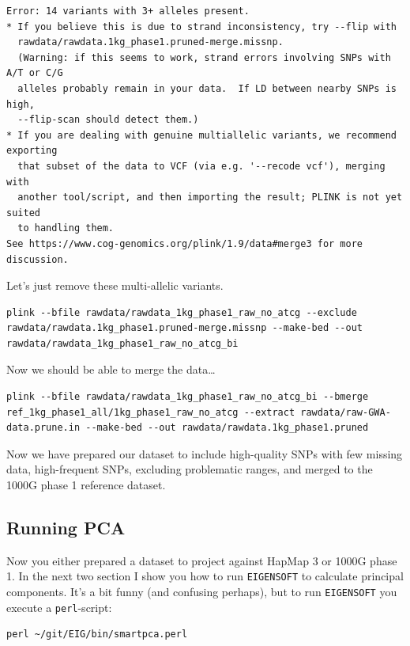 \documentclass[
]{book}
\newcommand{\passthrough}[1]{#1}
\begin{document}
\begin{lstlisting}
Error: 14 variants with 3+ alleles present.
* If you believe this is due to strand inconsistency, try --flip with
  rawdata/rawdata.1kg_phase1.pruned-merge.missnp.
  (Warning: if this seems to work, strand errors involving SNPs with A/T or C/G
  alleles probably remain in your data.  If LD between nearby SNPs is high,
  --flip-scan should detect them.)
* If you are dealing with genuine multiallelic variants, we recommend exporting
  that subset of the data to VCF (via e.g. '--recode vcf'), merging with
  another tool/script, and then importing the result; PLINK is not yet suited
  to handling them.
See https://www.cog-genomics.org/plink/1.9/data#merge3 for more discussion.
\end{lstlisting}

Let's just remove these multi-allelic variants.

\begin{lstlisting}
plink --bfile rawdata/rawdata_1kg_phase1_raw_no_atcg --exclude rawdata/rawdata.1kg_phase1.pruned-merge.missnp --make-bed --out rawdata/rawdata_1kg_phase1_raw_no_atcg_bi
\end{lstlisting}

Now we should be able to merge the data\ldots{}

\begin{lstlisting}
plink --bfile rawdata/rawdata_1kg_phase1_raw_no_atcg_bi --bmerge ref_1kg_phase1_all/1kg_phase1_raw_no_atcg --extract rawdata/raw-GWA-data.prune.in --make-bed --out rawdata/rawdata.1kg_phase1.pruned
\end{lstlisting}

Now we have prepared our dataset to include high-quality SNPs with few missing data, high-frequent SNPs, excluding problematic ranges, and merged to the 1000G phase 1 reference dataset.

\hypertarget{running-pca}{%
\subsection{Running PCA}\label{running-pca}}

Now you either prepared a dataset to project against HapMap 3 or 1000G phase 1. In the next two section I show you how to run \passthrough{\lstinline!EIGENSOFT!} to calculate principal components. It's a bit funny (and confusing perhaps), but to run \passthrough{\lstinline!EIGENSOFT!} you execute a \passthrough{\lstinline!perl!}-script:

\begin{lstlisting}
perl ~/git/EIG/bin/smartpca.perl
\end{lstlisting}
\end{document}
